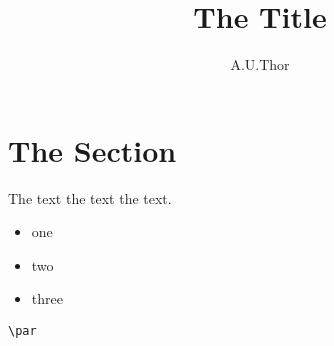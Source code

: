 \documentclass[11pt,a4paper]{scrartcl}
\begin{document}

\title{The Title}
\author{A.U.Thor}
\maketitle

\section{The Section}

The text the text the text.

\begin{itemize}
\item one
\item two
\item three
\end{itemize}

\verb|\par|
\end{document}
